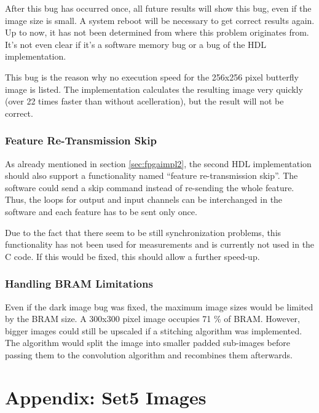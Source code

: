 \documentclass[
			fontsize = 12pt,
			paper = a4
			]
			{scrartcl}%
\newcommand{\?}{\ensuremath{^\texttt{\textbf [CITATION~NEEDED]}}}
\begin{document}
After this bug has occurred once, all future results will show this bug, even if the image size is small. A system reboot will be necessary to get correct results again.
Up to now, it has not been determined from where this problem originates from. It's not even clear if it's a software memory bug or a bug of the HDL implementation.

This bug is the reason why no execution speed for the 256x256 pixel butterfly image is listed. The implementation calculates the resulting image very quickly (over 22 times faster than without acelleration), but the result will not be correct.

\newpage
\subsubsection{Feature Re-Transmission Skip}

As already mentioned in section \ref{sec:fpgaimpl2}, the second HDL implementation should also support a functionality named \enquote{feature re-transmission skip}.
The software could send a skip command instead of re-sending the whole feature. Thus, the loops for output and input channels can be interchanged in the software and each feature has to be sent only once.

Due to the fact that there seem to be still synchronization problems, this functionality has not been used for measurements and is currently not used in the C code. If this would be fixed, this should allow a further speed-up.

\subsubsection{Handling BRAM Limitations}

Even if the dark image bug was fixed, the maximum image sizes would be limited by the BRAM size. A 300x300 pixel image occupies 71 \% of BRAM. However, bigger images could still be upscaled if a stitching algorithm was implemented. The algorithm would split the image into smaller padded sub-images before passing them to the convolution algorithm and recombines them afterwards.

\clearpage

\newpage
\appendix
\section{Appendix: Set5 Images}
\label{Appendix:set5}
\end{document}
